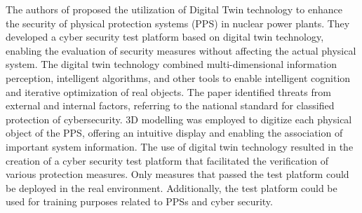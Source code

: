The authors of \cite{guoCyberSecurityRisk2021a} proposed the utilization of Digital Twin technology to enhance the security of physical protection systems (PPS) in nuclear power plants. They developed a cyber security test platform based on digital twin technology, enabling the evaluation of security measures without affecting the actual physical system. The digital twin technology combined multi-dimensional information perception, intelligent algorithms, and other tools to enable intelligent cognition and iterative optimization of real objects. The paper identified threats from external and internal factors, referring to the national standard for classified protection of cybersecurity. 3D modelling was employed to digitize each physical object of the PPS, offering an intuitive display and enabling the association of important system information. The use of digital twin technology resulted in the creation of a cyber security test platform that facilitated the verification of various protection measures. Only measures that passed the test platform could be deployed in the real environment. Additionally, the test platform could be used for training purposes related to PPSs and cyber security.
